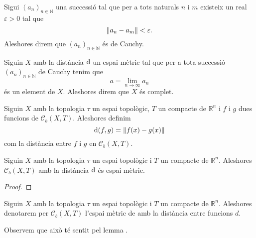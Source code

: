 \documentclass[../Apunts.tex]{subfiles}
\begin{document}
	\begin{definition}
		\label{def:successió de Cauchy amb normes}
		Sigui \((a_{n})_{n\in\mathbb{N}}\) una successió tal que per a tots naturals \(n\) i \(m\) existeix un real \(\varepsilon>0\) tal que
		\[\norm{a_{n}-a_{m}}<\varepsilon.\]
		Aleshores direm que \((a_{n})_{n\in\mathbb{N}}\) és de Cauchy.
	\end{definition}
	\begin{definition}
		\label{def:espai mètric complet}
		Siguin \(X\) amb la distància \(\operatorname{d}\) un espai mètric tal que per a tota successió \((a_{n})_{n\in\mathbb{N}}\) de Cauchy tenim que
		\[a=\lim_{n\to\infty}a_{n}\]
		és un element de \(X\). Aleshores direm que \(X\) és complet.
	\end{definition}
	\begin{definition}
		\label{def:distància entre funcions acotades}
		Siguin \(X\) amb la topologia \(\tau\) un espai topològic, \(T\) un compacte de \(\mathbb{R}^{n}\) i \(f\) i \(g\) dues funcions de \(\mathcal{C}_{b}(X,T)\). Aleshores definim
		\[\distancia(f,g)=\norm{f(x)-g(x)}\]
		com la distància entre \(f\) i \(g\) en \(\mathcal{C}_{b}(X,T)\).
	\end{definition}
	\begin{lemma}
		\label{thm:l'espai de funcions contínues i acotades és un espai mètric}
		Siguin \(X\) amb la topologia \(\tau\) un espai topològic i \(T\) un compacte de \(\mathbb{R}^{n}\). Aleshores \(\mathcal{C}_{b}(X,T)\) amb la distància \(\operatorname{d}\) és espai mètric.
		\begin{proof}
		\end{proof}
	\end{lemma}
	\begin{notation}
		Siguin \(X\) amb la topologia \(\tau\) un espai topològic i \(T\) un compacte de \(\mathbb{R}^{n}\). Aleshores denotarem per \(\mathcal{C}_{b}(X,T)\) l'espai mètric de amb la distància entre funcions \(d\).
		
		Observem que això té sentit pel lemma .
	\end{notation}
\end{document}
